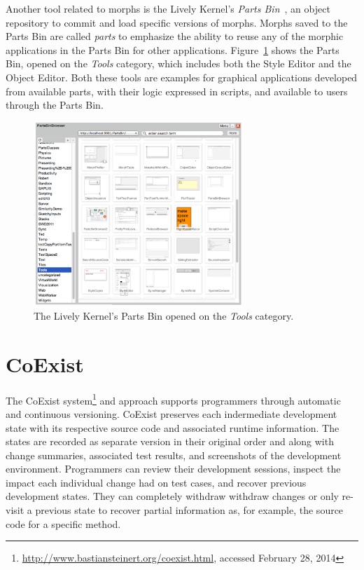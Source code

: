 Another tool related to morphs is the Lively Kernel's \emph{Parts Bin}~\cite{Lincke2012LPC}, an object repository to commit and load specific versions of morphs.
Morphs saved to the Parts Bin are called \emph{parts} to emphasize the ability to reuse any of the morphic applications in the Parts Bin for other applications.
Figure~\ref{fig:PartsBin} shows the Parts Bin, opened on the \emph{Tools} category, which includes both the Style Editor and the Object Editor.
Both these tools are examples for graphical applications developed from available parts, with their logic expressed in scripts, and available to users through the Parts Bin.

\begin{figure}[h]
    \centering
    \includegraphics[width=0.7\textwidth]{figures/2_background/3_partsBin.pdf}
    \caption{The Lively Kernel's Parts Bin opened on the \emph{Tools} category.}
    \label{fig:PartsBin}
\end{figure}


\section{CoExist}

The CoExist system\footnote{\url{http://www.bastiansteinert.org/coexist.html}, accessed February 28, 2014} and approach supports programmers through automatic and continuous versioning.
CoExist preserves each indermediate development state with its respective source code and associated runtime information.
The states are recorded as separate version in their original order and along with change summaries, associated test results, and screenshots of the development environment.
Programmers can review their development sessions, inspect the impact each individual change had on test cases, and recover previous development states.
They can completely withdraw withdraw changes or only re-visit a previous state to recover partial information as, for example, the source code for a specific method.

